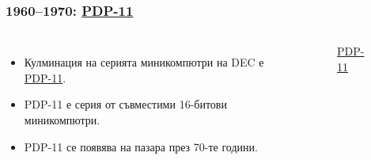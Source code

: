 \documentclass[ignorenonframetext, hyperref=unicode]{beamer}
\begin{document}
\begin{frame}
\frametitle{1960--1970: \href{http://en.wikipedia.org/wiki/PDP-11}{PDP-11}}
\begin{columns}
\begin{itemize}
  \item  Кулминация на серията миникомпютри на DEC е
  \href{http://en.wikipedia.org/wiki/PDP-11}{PDP-11}. 
  \item PDP-11 е серия от съвместими 16-битови миникомпютри.
  \item PDP-11 се появява на пазара през 70-те години.
\end{itemize}
\begin{figure}
\center
{}
\caption{\href{http://en.wikipedia.org/wiki/Image:Pdp-11-40.jpg}{PDP-11}}
\end{figure}
\end{columns}
\end{frame}
\end{document}
